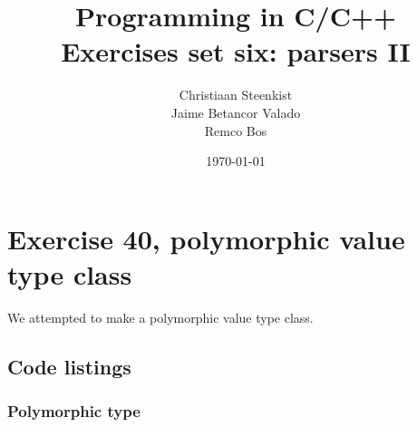 \documentclass[11pt]{article}
\begin{document}
\title{Programming in C/C++ \\
       Exercises set six: parsers II
}
\date{\today}
\author{Christiaan Steenkist \\
Jaime Betancor Valado \\
Remco Bos \\
}

\maketitle
\section*{Exercise 40, polymorphic value type class}
We attempted to make a polymorphic value type class.

\subsection*{Code listings}











\subsubsection*{Polymorphic type}




\end{document}
